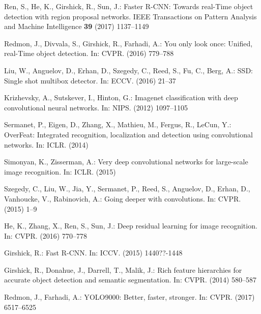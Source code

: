\documentclass[runningheads]{llncs}
\begin{document}

\begin{thebibliography}{10}

Ren, S., He, K., Girshick, R., Sun, J.:
\newblock Faster {R}-{C}{N}{N}: Towards real-{T}ime object detection with
  region proposal networks.
\newblock IEEE Transactions on Pattern Analysis and Machine Intelligence
  \textbf{39} (2017)  1137--1149

Redmon, J., Divvala, S., Girshick, R., Farhadi, A.:
\newblock You only look once: Unified, real-{T}ime object detection.
\newblock In: CVPR. (2016)  779--788

Liu, W., Anguelov, D., Erhan, D., Szegedy, C., Reed, S., Fu, C., Berg, A.:
\newblock S{S}{D}: Single shot multibox detector.
\newblock In: ECCV. (2016)  21--37

Krizhevsky, A., Sutskever, I., Hinton, G.:
\newblock Imagenet classification with deep convolutional neural networks.
\newblock In: NIPS. (2012)  1097--1105

Sermanet, P., Eigen, D., Zhang, X., Mathieu, M., Fergus, R., LeCun, Y.:
\newblock Over{F}eat: Integrated recognition, localization and detection using
  convolutional networks.
\newblock In: ICLR. (2014)

Simonyan, K., Zisserman, A.:
\newblock Very deep convolutional networks for large-scale image recognition.
\newblock In: ICLR. (2015)

Szegedy, C., Liu, W., Jia, Y., Sermanet, P., Reed, S., Anguelov, D., Erhan, D.,
  Vanhoucke, V., Rabinovich, A.:
\newblock Going deeper with convolutions.
\newblock In: CVPR. (2015)  1--9

He, K., Zhang, X., Ren, S., Sun, J.:
\newblock Deep residual learning for image recognition.
\newblock In: CVPR. (2016)  770--778

Girshick, R.:
\newblock Fast {R}-{C}{N}{N}.
\newblock In: ICCV. (2015)  1440??-1448

Girshick, R., Donahue, J., Darrell, T., Malik, J.:
\newblock Rich feature hierarchies for accurate object detection and semantic
  segmentation.
\newblock In: CVPR. (2014)  580--587

Redmon, J., Farhadi, A.:
\newblock Y{O}{L}{O}9000: Better, faster, stronger.
\newblock In: CVPR. (2017)  6517--6525


\end{thebibliography}
\end{document}

